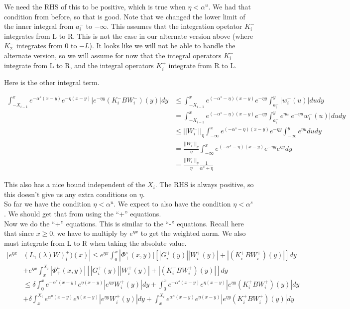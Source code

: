 \documentclass[12pt]{article}
\begin{document}
We need the RHS of this to be positive, which is true when $\eta < \alpha^u$. We had that condition from before, so that is good. Note that we changed the lower limit of the inner integral from $a_i^-$ to $-\infty$. This assumes that the integration opetator $K_i^-$ integrates from L to R. This is not the case in our alternate version above (where $K_2^-$ integrates from 0 to $-L$). It looks like we will not be able to handle the alternate version, so we will assume for now that the integral operators $K_i^-$ integrate from L to R, and the integral operators $K_i^+$ integrate from R to L.

Here is the other integral term. 

\begin{align*}
\int_{-X_{i-1}}^x e^{-\alpha^s (x-y)}e^{-\eta(x-y)}|e^{-\eta y} (K_i^- B W_i^-)(y)| dy &\leq \int_{-X_{i-1}}^x e^{(-\alpha^s - \eta)(x-y)}e^{-\eta y} \int_{a_i^-}^y |w_i^-(u)| du dy \\
&= \int_{-X_{i-1}}^x e^{(-\alpha^s - \eta)(x-y)}e^{-\eta y} \int_{a_i^-}^y e^{\eta u} |e^{-\eta u} w_i^-(u)| du dy \\
&\leq ||W_i^-||_\eta \int_{-\infty}^x e^{(-\alpha^s - \eta)(x-y)}e^{-\eta y} \int_{-\infty}^y e^{\eta u} du dy \\
&= \frac{||W_i^-||_\eta}{\eta} \int_{-\infty}^x e^{(-\alpha^s - \eta)(x-y)}e^{-\eta y} e^{\eta y} dy \\
&= \frac{||W_i^-||_\eta}{\eta} \frac{1}{\alpha^s + \eta}
\end{align*}

This also has a nice bound independent of the $X_i$. The RHS is always positive, so this doesn't give us any extra conditions on $\eta$.\\

So far we have the condition $\eta < \alpha^u$. We expect to also have the condition $\eta < \alpha^s$. We should get that from using the ``+'' equations.\\

Now we do the ``+'' equations. This is similar to the ``-'' equations. Recall here that since $x \geq 0$, we have to multiply by $e^{\eta x}$ to get the weighted norm. We also must integrate from L to R when taking the absolute value.\\


\begin{align*}
|e^{\eta x} & (L_1(\lambda)W)_i^+)(x) | \leq e^{\eta x} \int_0^x |\Phi^s_+(x, y)|[|G_i^+(y)||W_i^+(y)| + |(K_i^+ B W_i^+)(y)| ] dy \\
&+ e^{\eta x} \int_x^{X_i} |\Phi^u_+(x, y)|[|G_i^+(y)||W_i^+(y)| + |(K_i^+ B W_i^+)(y)| ] dy \\
&\leq \delta \int_0^x e^{-\alpha^s (x-y)}e^{\eta(x-y)}|e^{\eta y} W_i^+(y)| dy 
+ \int_0^x e^{-\alpha^s (x-y)}e^{\eta(x-y)}|e^{\eta y} (K_i^+ B W_i^+)(y)| dy \\
&+ \delta \int_x^{X_i} e^{\alpha^u (x-y)}e^{\eta(x-y)}|e^{\eta y} W_i^+(y)| dy 
+ \int_x^{X_i} e^{\alpha^u (x-y)}e^{\eta(x-y)}|e^{\eta y} (K_i^+ B W_i^+)(y)| dy \\ 
\end{align*}
\end{document}
